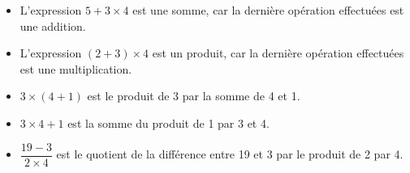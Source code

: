 \documentclass[14pt,a4paper]{extarticle}
\begin{document}
	
\begin{myexs}
	\begin{itemize}
		\item L'expression $5 + 3 \times 4$ est une somme, car la dernière opération effectuées est une addition.
		
		\item L'expression $(2 + 3 ) \times 4$ est un produit, car la dernière opération effectuées est une multiplication.
		
		\item $ 3 \times (4 + 1)$ est le produit de 3 par la somme de 4 et 1.
		
		\item $ 3 \times 4 + 1$ est la somme du produit de 1 par 3 et  4.
		
		\item $\dfrac{19 - 3}{2 \times 4}$ est le quotient de la différence entre  19 et 3 par le produit de 2 par 4.
	\end{itemize}
\end{myexs}

\end{document}
